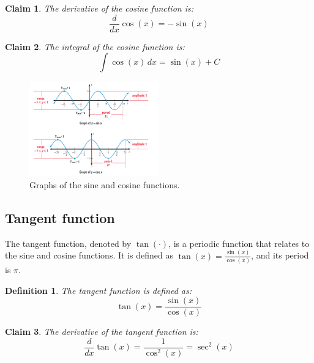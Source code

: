 \documentclass[11pt]{book} %
\newtheorem{definition}{Definition}[section]
\newtheorem*{claim*}{Claim}
\begin{document}
\begin{claim*}
    The derivative of the cosine function is:
    \begin{equation}
        \frac{d}{dx} \cos(x) = -\sin(x)
    \end{equation}
\end{claim*}

\begin{claim*}
    The integral of the cosine function is:
    \begin{equation}
        \int \cos(x) \, dx = \sin(x) + C
    \end{equation}
\end{claim*}

\begin{figure}[h]
    \centering
    \includegraphics[width=0.5\textwidth]{Figs/sin_and_cos.png}
    \caption{Graphs of the sine and cosine functions.}
    \label{fig:sine_cosine}
\end{figure}


\subsection{Tangent function}
The tangent function, denoted by \(\tan(\cdot)\), is a periodic function that relates to the sine and cosine functions.
It is defined as \(\tan(x) = \frac{\sin(x)}{\cos(x)}\), and its period is \(\pi\).

\begin {definition}
    The tangent function is defined as:
    \begin{equation}
        \tan(x) = \frac{\sin(x)}{\cos(x)}
    \end{equation}
\end{definition}

\begin{claim*}
    The derivative of the tangent function is:
    \begin{equation}
        \frac{d}{dx} \tan(x) = \frac{1}{\cos^2(x)} = \sec^2(x)
    \end{equation}
\end{claim*}
\end{document}
